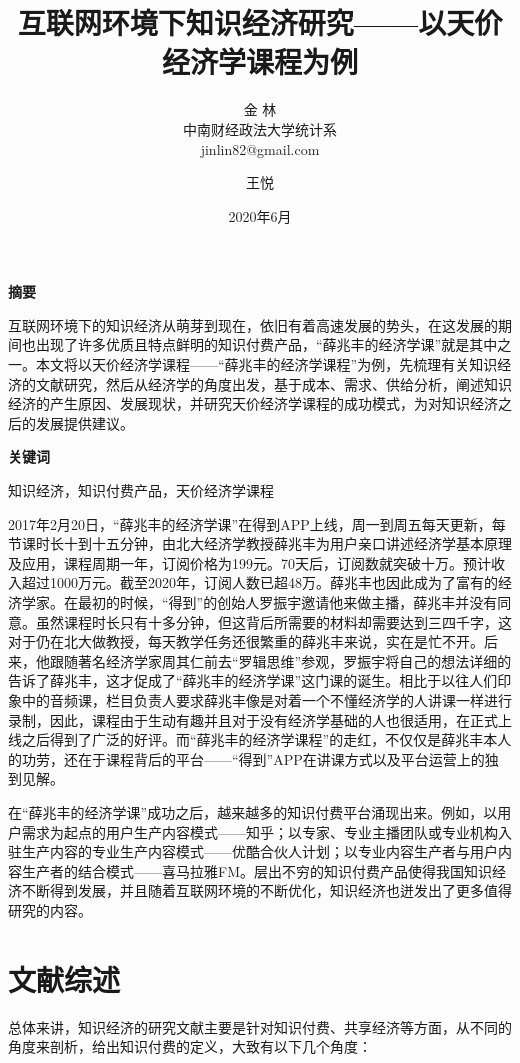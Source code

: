 \documentclass[UTF8,a4paper,12pt]{ctexart}  %
\author{\CJKfamily{kai} 金 \enspace 林 \\ \CJKfamily{kai} 中南财经政法大学统计系 \\ jinlin82@gmail.com}
\title{\LARGE\textbf{互联网环境下知识经济研究------以天价经济学课程为例}}
\author{王悦}
\date{2020年6月}
\begin{document}
\maketitle






\textbf{摘要}

互联网环境下的知识经济从萌芽到现在，依旧有着高速发展的势头，在这发展的期间也出现了许多优质且特点鲜明的知识付费产品，``薛兆丰的经济学课''就是其中之一。本文将以天价经济学课程------``薛兆丰的经济学课程''为例，先梳理有关知识经济的文献研究，然后从经济学的角度出发，基于成本、需求、供给分析，阐述知识经济的产生原因、发展现状，并研究天价经济学课程的成功模式，为对知识经济之后的发展提供建议。

\textbf{关键词}

知识经济，知识付费产品，天价经济学课程

2017年2月20日，``薛兆丰的经济学课''在得到APP上线，周一到周五每天更新，每节课时长十到十五分钟，由北大经济学教授薛兆丰为用户亲口讲述经济学基本原理及应用，课程周期一年，订阅价格为199元。70天后，订阅数就突破十万。预计收入超过1000万元。截至2020年，订阅人数已超48万。薛兆丰也因此成为了富有的经济学家。在最初的时候，``得到''的创始人罗振宇邀请他来做主播，薛兆丰并没有同意。虽然课程时长只有十多分钟，但这背后所需要的材料却需要达到三四千字，这对于仍在北大做教授，每天教学任务还很繁重的薛兆丰来说，实在是忙不开。后来，他跟随著名经济学家周其仁前去``罗辑思维''参观，罗振宇将自己的想法详细的告诉了薛兆丰，这才促成了``薛兆丰的经济学课''这门课的诞生。相比于以往人们印象中的音频课，栏目负责人要求薛兆丰像是对着一个不懂经济学的人讲课一样进行录制，因此，课程由于生动有趣并且对于没有经济学基础的人也很适用，在正式上线之后得到了广泛的好评。而``薛兆丰的经济学课程''的走红，不仅仅是薛兆丰本人的功劳，还在于课程背后的平台------``得到''APP在讲课方式以及平台运营上的独到见解。

在``薛兆丰的经济学课''成功之后，越来越多的知识付费平台涌现出来。例如，以用户需求为起点的用户生产内容模式------知乎；以专家、专业主播团队或专业机构入驻生产内容的专业生产内容模式------优酷合伙人计划；以专业内容生产者与用户内容生产者的结合模式------喜马拉雅FM。层出不穷的知识付费产品使得我国知识经济不断得到发展，并且随着互联网环境的不断优化，知识经济也迸发出了更多值得研究的内容。

\hypertarget{section}{%
\section{文献综述}\label{section}}

总体来讲，知识经济的研究文献主要是针对知识付费、共享经济等方面，从不同的角度来剖析，给出知识付费的定义，大致有以下几个角度：
\end{document}
